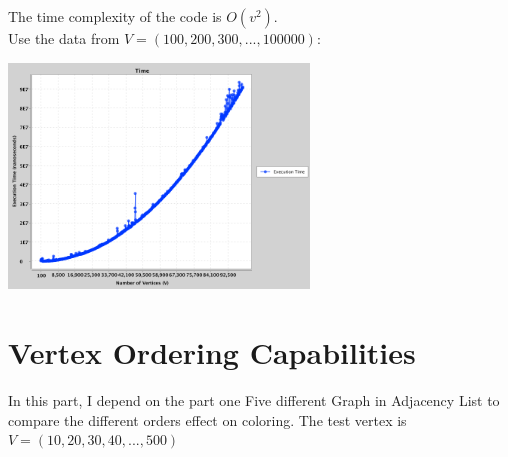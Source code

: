 \documentclass{article}
\begin{document}
    The time complexity of the code is $O(v^2)$.\\
    Use the data from $V = (100, 200, 300, ... , 100000)$: \\
    \begin{center}
            \includegraphics[width=0.6\textwidth]{color3.png}
    \end{center}


\section{Vertex Ordering Capabilities}
In this part, I depend on the part one Five different Graph in Adjacency List to compare the different orders effect on coloring. The test vertex is $V = (10, 20, 30, 40, ... , 500)$
\end{document}
